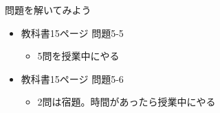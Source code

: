 \documentclass[slide05.tex]{subfiles}
\begin{document}
\begin{frame}[fragile]
    \begin{exampleblock}{問題を解いてみよう}
    \begin{itemize}
        \item 教科書15ページ 問題5-5
        \begin{itemize}
            \item 5問を授業中にやる
        \end{itemize}
        \item 教科書15ページ 問題5-6
        \begin{itemize}
            \item 2問は宿題。時間があったら授業中にやる
        \end{itemize}
    \end{itemize}
    \end{exampleblock}
\end{frame}
\end{document}

